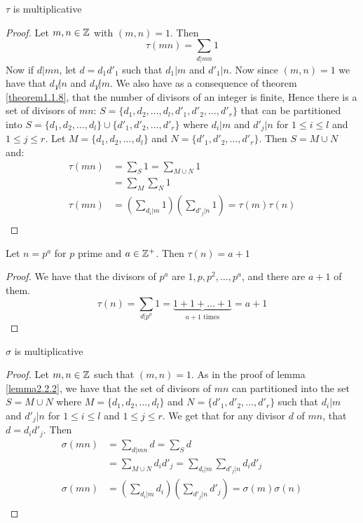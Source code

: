 \begin{lemma}\label{lemma2.2.2}
    $\tau$ is multiplicative
\end{lemma}
\begin{proof}
    Let $m,n \in \mathbb{Z}$ with $(m,n)=1$. Then
        \begin{equation*}
            \tau(mn)=\sum_{d|mn} 1
        \end{equation*}
    Now if $d|mn$, let $d=d_1d'_1$ such that $d_1|m$ and $d'_1|n$. Now since $(m,n)=1$ we have that $d_1 \not|n$ and $d_1 \not| m$. We also have as a consequence of theorem \ref{theorem1.1.8}, that the number of divisors of an integer is finite, Hence there is a set of divisors of $mn$: $S=\{d_1,d_2, \dots, d_l,d'_1,d'_2, \dots,d'_r\}$ that can be partitioned into $S=\{d_1,d_2, \dots, d_l\} \cup \{d'_1,d'_2, \dots,d'_r\}$ where $d_i|m$ and $d'_j|n$ for $1 \leq i \leq l$ and $1 \leq j \leq r$. Let $M=\{d_1,d_2, \dots, d_l\}$ and $N=\{d'_1,d'_2, \dots,d'_r\}$. Then $S=M \cup N$ and:
        \begin{align*}
            \tau(mn) &= \sum_{S} 1 = \sum_{M \cup N} 1 \\
                     &= \sum_{M}\sum_{N} 1 \\
            \tau(mn) & = (\sum_{d_i|m} 1)(\sum_{d'_j|n} 1)=\tau(m)\tau(n) \\
        \end{align*}
\end{proof}

\begin{lemma}\label{lemma2.2.3}
    Let $n=p^a$ for $p$ prime and $a \in \mathbb{Z}^+$. Then $\tau(n)=a+1$
\end{lemma}
\begin{proof}
    We have that the divisors of $p^a$ are $1,p,p^2, \dots, p^a$, and there are $a+1$ of them.
    \begin{equation*}
        \tau(n)=\sum_{d|p^a}1 = \underbrace{1+1+\dots+1}_{\text{$a+1$ times}}=a+1
    \end{equation*}
\end{proof}

\begin{lemma}\label{lemma2.2.4}
    $\sigma$ is multiplicative
\end{lemma}
\begin{proof}
    Let $m,n \in \mathbb{Z}$ such that $(m,n)=1$. As in the proof of lemma \ref{lemma2.2.2}, we have that the set of divisors of $mn$ can partitioned into the set $S=M \cup N$ where $M=\{d_1,d_2, \dots, d_l\}$ and $N=\{d'_1,d'_2, \dots, d'_r\}$ such that $d_i|m$ and $d'_j|n$ for $1 \leq i \leq l$ and $1 \leq j \leq r$. We get that for any divisor $d$ of $mn$, that $d=d_id'_j$. Then
        \begin{align*}
            \sigma(mn) &= \sum_{d|mn} d = \sum_{S} d \\
                       &= \sum_{M \cup N} d_id'_j = \sum_{d_i|m}\sum_{d'_j|n} d_id'_j \\
            \sigma(mn) &= (\sum_{d_i|m} d_i)(\sum_{d'_j|n} d'_j) = \sigma(m)\sigma(n) \\
        \end{align*}
\end{proof}

